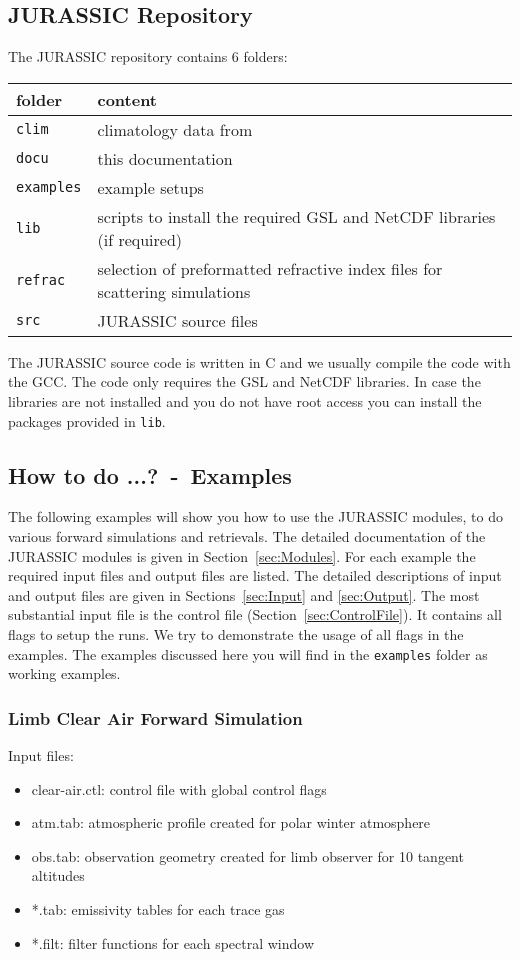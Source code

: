\subsection{JURASSIC Repository}
The JURASSIC repository contains 6 folders:
\begin{table}[!h]
\begin{tabular}{l|l}
folder            & content \\
\hline
\texttt{clim}     & climatology data from \citet{Remedios2007}\\
\texttt{docu}     & this documentation \\
\texttt{examples} & example setups \\
\texttt{lib}      & scripts to install the required GSL and NetCDF libraries (if required)\\
\texttt{refrac}   & selection of preformatted refractive index files for scattering simulations \\
\texttt{src}      & JURASSIC source files \\
\end{tabular}
\end{table}

The JURASSIC source code is written in C and we usually compile the code with the GCC. The code only requires the GSL and NetCDF libraries. In case the libraries are not installed and you do not have root access you can install the packages provided in \texttt{lib}.

\subsection{How to do ...?~-~Examples}
The following examples will show you how to use the JURASSIC modules, to do various forward simulations and retrievals. The detailed documentation of the JURASSIC modules is given in Section~\ref{sec:Modules}. For each example the required input files and output files are listed. The detailed descriptions of input and output files are given in Sections~\ref{sec:Input} and \ref{sec:Output}. The most substantial input file is the control file (Section~\ref{sec:ControlFile}). It contains all flags to setup the runs. We try to demonstrate the usage of all flags in the examples. The examples discussed here you will find in the \texttt{examples} folder as working examples.

\subsubsection{Limb Clear Air Forward Simulation}
\label{sec:LimbClear}
Input files:
\begin{itemize}
\item clear-air.ctl: control file with global control flags
\item atm.tab: atmospheric profile created for polar winter atmosphere
\item obs.tab: observation geometry created for limb observer for 10 tangent altitudes
\item *.tab: emissivity tables for each trace gas
\item *.filt: filter functions for each spectral window
\end{itemize}

